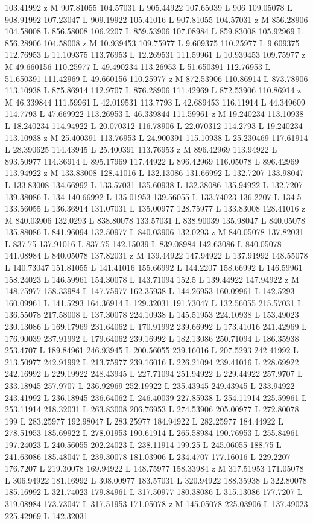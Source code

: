 {\begin{scope}[local bounding box=bb]
{103.41992 z M 907.81055 104.57031 L 905.44922 107.65039 L 906 109.05078 L 908.91992 107.23047 L 909.19922 105.41016 L 907.81055 104.57031 z M 856.28906 104.58008 L 856.58008 106.2207 L 859.53906 107.08984 L 859.83008 105.92969 L 856.28906 104.58008 z M 10.939453 109.75977 L 9.609375 110.25977 L 9.609375 112.76953 L 11.109375 113.76953 L 12.269531 111.59961 L 10.939453 109.75977 z M 49.660156 110.25977 L 49.490234 113.26953 L 51.650391 112.76953 L 51.650391 111.42969 L 49.660156 110.25977 z M 872.53906 110.86914 L 873.78906 113.10938 L 875.86914 112.9707 L 876.28906 111.42969 L 872.53906 110.86914 z M 46.339844 111.59961 L 42.019531 113.7793 L 42.689453 116.11914 L 44.349609 114.7793 L 47.669922 113.26953 L 46.339844 111.59961 z M 19.240234 113.10938 L 18.240234 114.94922 L 20.070312 116.78906 L 22.070312 114.2793 L 19.240234 113.10938 z M 25.400391 113.76953 L 24.900391 115.10938 L 25.230469 117.61914 L 28.390625 114.43945 L 25.400391 113.76953 z M 896.42969 113.94922 L 893.50977 114.36914 L 895.17969 117.44922 L 896.42969 116.05078 L 896.42969 113.94922 z M 133.83008 128.41016 L 132.13086 131.66992 L 132.7207 133.98047 L 133.83008 134.66992 L 133.57031 135.60938 L 132.38086 135.94922 L 132.7207 139.38086 L 134 140.66992 L 135.01953 139.56055 L 133.74023 136.2207 L 134.5 133.56055 L 136.36914 131.07031 L 135.00977 128.75977 L 133.83008 128.41016 z M 840.03906 132.0293 L 838.80078 133.57031 L 838.90039 135.98047 L 840.05078 135.88086 L 841.96094 132.50977 L 840.03906 132.0293 z M 840.05078 137.82031 L 837.75 137.91016 L 837.75 142.15039 L 839.08984 142.63086 L 840.05078 141.08984 L 840.05078 137.82031 z M 139.44922 147.94922 L 137.91992 148.55078 L 140.73047 151.81055 L 141.41016 155.66992 L 144.2207 158.66992 L 146.59961 158.24023 L 146.59961 154.30078 L 143.71094 152.5 L 139.44922 147.94922 z M 148.75977 158.33984 L 147.75977 162.35938 L 144.26953 160.09961 L 142.5293 160.09961 L 141.5293 164.36914 L 129.32031 191.73047 L 132.56055 215.57031 L 136.55078 217.58008 L 137.30078 224.10938 L 145.51953 224.10938 L 153.49023 230.13086 L 169.17969 231.64062 L 170.91992 239.66992 L 173.41016 241.42969 L 176.90039 237.91992 L 179.64062 239.16992 L 182.13086 250.71094 L 186.35938 253.4707 L 189.84961 246.93945 L 200.56055 239.16016 L 207.5293 242.41992 L 213.50977 242.91992 L 213.75977 239.16016 L 226.21094 239.41016 L 228.69922 242.16992 L 229.19922 248.43945 L 227.71094 251.94922 L 229.44922 257.9707 L 233.18945 257.9707 L 236.92969 252.19922 L 235.43945 249.43945 L 233.94922 243.41992 L 236.18945 236.64062 L 246.40039 227.85938 L 254.11914 225.59961 L 253.11914 218.32031 L 263.83008 206.76953 L 274.53906 205.00977 L 272.80078 199 L 283.25977 192.98047 L 283.25977 184.94922 L 282.25977 184.44922 L 278.51953 185.69922 L 278.01953 190.61914 L 265.58984 190.76953 L 255.84961 197.24023 L 240.56055 202.24023 L 238.11914 199.25 L 245.06055 188.75 L 241.63086 185.48047 L 239.30078 181.03906 L 234.4707 177.16016 L 229.2207 176.7207 L 219.30078 169.94922 L 148.75977 158.33984 z M 317.51953 171.05078 L 306.94922 181.16992 L 308.00977 183.57031 L 320.94922 188.35938 L 322.80078 185.16992 L 321.74023 179.84961 L 317.50977 180.38086 L 315.13086 177.7207 L 319.08984 173.73047 L 317.51953 171.05078 z M 145.05078 225.03906 L 137.49023 225.42969 L 142.32031 }
\end{scope}}
